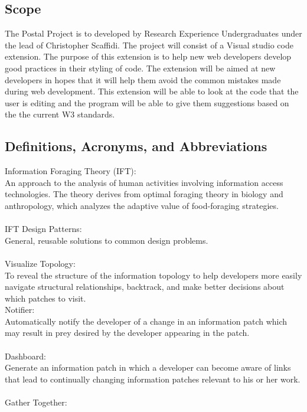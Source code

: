 \documentclass[letterpaper,10pt,titlepage,draftclsnofoot,onecolumn,onesided] {IEEEtran}
\begin{document}
\subsection{Scope}
The Postal Project is to developed by Research Experience Undergraduates under the lead of Christopher Scaffidi. 
The project will consist of a Visual studio code extension.
The purpose of this extension is to help new web developers develop good practices in their styling of code.
The extension will be aimed at new developers in hopes that it will help them avoid the common mistakes made during web development.
This extension will be able to look at the code that the user is editing and the program will be able to give them suggestions based on the the current W3 standards. 

\subsection{Definitions, Acronyms, and Abbreviations}
\setlength\parindent{0pt}Information Foraging Theory (IFT): \\
An approach to the analysis of human activities involving information access technologies.
The theory derives from optimal foraging theory in biology and anthropology, which analyzes the adaptive value of food-foraging strategies.\cite{xeroxift}\\\\
IFT Design Patterns: \\
General, reusable solutions to common design problems.\cite{iftwiki}\\\\
Visualize Topology: \\
To reveal the structure of the information topology to help developers more easily navigate structural relationships, backtrack, and make better decisions about which patches to visit.\cite{iftwiki}\\
Notifier: \\
Automatically notify the developer of a change in an information patch which may result in prey desired by the developer appearing in the patch.\cite{iftwiki}\\\\
Dashboard: \\
Generate an information patch in which a developer can become aware of links that lead to continually changing information patches relevant to his or her work.\cite{iftwiki}\\\\
Gather Together: \\
\end{document}
